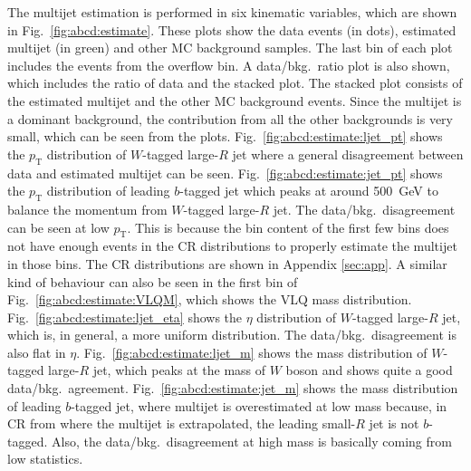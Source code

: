 The multijet estimation is performed in six kinematic variables, which are shown in Fig.\ \ref{fig:abcd:estimate}. These plots show the data events (in dots), estimated multijet (in green) and other MC background samples. The last bin of each plot includes the events from the overflow bin. A data/bkg.\ ratio plot is also shown, which includes the ratio of data and the stacked plot. The stacked plot consists of the estimated multijet and the other MC background events. Since the multijet is a dominant background, the contribution from all the other backgrounds is very small, which can be seen from the plots. Fig.\ \ref{fig:abcd:estimate:ljet_pt} shows the $p_{\text{T}}$ distribution of $W$-tagged large-$R$ jet where a general disagreement between data and estimated multijet can be seen. Fig.\ \ref{fig:abcd:estimate:jet_pt} shows the $p_{\text{T}}$ distribution of leading $b$-tagged jet which peaks at around \SI{500}{\giga\electronvolt} to balance the momentum from $W$-tagged large-$R$ jet. The data/bkg.\ disagreement can be seen at low $p_{\text{T}}$. This is because the bin content of the first few bins does not have enough events in the CR distributions to properly estimate the multijet in those bins. The CR distributions are shown in Appendix \ref{sec:app}. A similar kind of behaviour can also be seen in the first bin of Fig.\ \ref{fig:abcd:estimate:VLQM}, which shows the VLQ mass distribution. Fig.\ \ref{fig:abcd:estimate:ljet_eta} shows the $\eta$ distribution of $W$-tagged large-$R$ jet, which is, in general, a more uniform distribution. The data/bkg.\ disagreement is also flat in $\eta$. Fig.\ \ref{fig:abcd:estimate:ljet_m} shows the mass distribution of $W$-tagged large-$R$ jet, which peaks at the mass of $W$ boson and shows quite a good data/bkg.\ agreement. Fig.\ \ref{fig:abcd:estimate:jet_m} shows the mass distribution of leading $b$-tagged jet, where multijet is overestimated at low mass because, in CR from where the multijet is extrapolated, the leading small-$R$ jet is not $b$-tagged. Also, the data/bkg.\ disagreement at high mass is basically coming from low statistics. 


